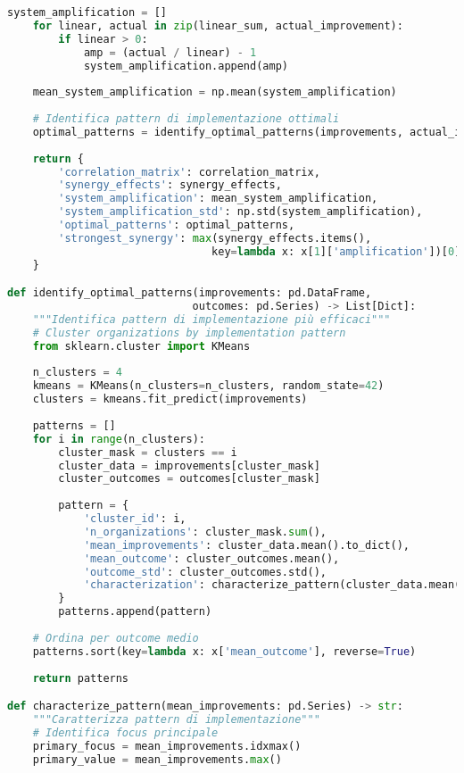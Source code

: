 \begin{lstlisting}[language=Python, caption=Analisi Sinergie Framework GIST]
    system_amplification = []
    for linear, actual in zip(linear_sum, actual_improvement):
        if linear > 0:
            amp = (actual / linear) - 1
            system_amplification.append(amp)
    
    mean_system_amplification = np.mean(system_amplification)
    
    # Identifica pattern di implementazione ottimali
    optimal_patterns = identify_optimal_patterns(improvements, actual_improvement)
    
    return {
        'correlation_matrix': correlation_matrix,
        'synergy_effects': synergy_effects,
        'system_amplification': mean_system_amplification,
        'system_amplification_std': np.std(system_amplification),
        'optimal_patterns': optimal_patterns,
        'strongest_synergy': max(synergy_effects.items(), 
                                key=lambda x: x[1]['amplification'])[0]
    }

def identify_optimal_patterns(improvements: pd.DataFrame, 
                             outcomes: pd.Series) -> List[Dict]:
    """Identifica pattern di implementazione più efficaci"""
    # Cluster organizations by implementation pattern
    from sklearn.cluster import KMeans
    
    n_clusters = 4
    kmeans = KMeans(n_clusters=n_clusters, random_state=42)
    clusters = kmeans.fit_predict(improvements)
    
    patterns = []
    for i in range(n_clusters):
        cluster_mask = clusters == i
        cluster_data = improvements[cluster_mask]
        cluster_outcomes = outcomes[cluster_mask]
        
        pattern = {
            'cluster_id': i,
            'n_organizations': cluster_mask.sum(),
            'mean_improvements': cluster_data.mean().to_dict(),
            'mean_outcome': cluster_outcomes.mean(),
            'outcome_std': cluster_outcomes.std(),
            'characterization': characterize_pattern(cluster_data.mean())
        }
        patterns.append(pattern)
    
    # Ordina per outcome medio
    patterns.sort(key=lambda x: x['mean_outcome'], reverse=True)
    
    return patterns

def characterize_pattern(mean_improvements: pd.Series) -> str:
    """Caratterizza pattern di implementazione"""
    # Identifica focus principale
    primary_focus = mean_improvements.idxmax()
    primary_value = mean_improvements.max()
    

\end{lstlisting}

